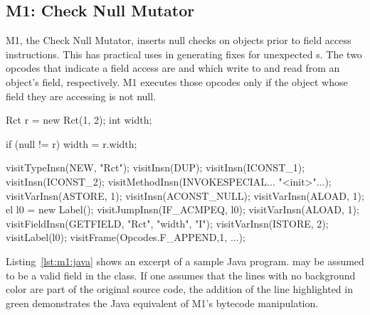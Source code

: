 \subsection{M1: Check Null Mutator}
M1, the Check Null Mutator, inserts null checks on objects prior to field access instructions.
This has practical uses in generating fixes for unexpected s.
The two opcodes that indicate a field access are  and  which write to and read from an object's field, respectively.
M1 executes those opcodes only if the object whose field they are accessing is not null.

\begin{Java}[%
    linebackgroundcolor={%
      \ifnum 0<\value{lstnumber} \color{white}\fi%
      \ifnum 4=\value{lstnumber} \color{diff add}\fi%
    },%
    caption={Sample Java With Simulated M1},%
    label={lst:m1:java},%
  ]
  Rct r = new Rct(1, 2);
  int width;

  if (null != r)
      width = r.width;
\end{Java}

\begin{Java}[%
    linebackgroundcolor={%
      \ifnum 0<\value{lstnumber} \color{white}\fi%
      \ifnum 6=\value{lstnumber} \color{diff add}\fi%
      \ifnum 7=\value{lstnumber} \color{diff add}\fi%
      \ifnum 8=\value{lstnumber} \color{diff add}\fi%
      \ifnum 9=\value{lstnumber} \color{diff add}\fi%
      \ifnum 10=\value{lstnumber} \color{diff add}\fi%
      \ifnum 14=\value{lstnumber} \color{diff add}\fi%
      \ifnum 15=\value{lstnumber} \color{diff add}\fi%
    },%
    caption={ASMified Version of Listing~\ref{lst:m1:java}},%
    label={lst:m1:jvm},%
  ]
  visitTypeInsn(NEW, "Rct");
  visitInsn(DUP);
  visitInsn(ICONST_1);
  visitInsn(ICONST_2);
  visitMethodInsn(INVOKESPECIAL... "<init>"...);
  visitVarInsn(ASTORE, 1);
  visitInsn(ACONST_NULL);
  visitVarInsn(ALOAD, 1);
  el l0 = new Label();
  visitJumpInsn(IF_ACMPEQ, l0);
  visitVarInsn(ALOAD, 1);
  visitFieldInsn(GETFIELD, "Rct", "width", "I");
  visitVarInsn(ISTORE, 2);
  visitLabel(l0);
  visitFrame(Opcodes.F_APPEND,1, ...);
\end{Java}

Listing~\ref{lst:m1:java} shows an excerpt of a sample Java program.
 may be assumed to be a valid field in the  class.
If one assumes that the lines with no background color are part of the original source code, the addition of the line highlighted in green demonstrates the Java equivalent of M1's bytecode manipulation.

